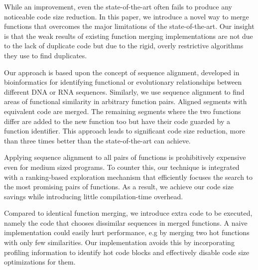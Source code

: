 While an improvement, even the state-of-the-art often fails to produce any
noticeable code size reduction. In this paper, we introduce a novel way to merge
functions that overcomes the major limitations of the state-of-the-art. Our
insight is that the weak results of existing function merging implementations
are not due to the lack of duplicate code but due to the rigid, overly restrictive
algorithms they use to find duplicates.

Our approach is based upon the concept of sequence alignment, developed in
bioinformatics for identifying functional or evolutionary relationships between
different DNA or RNA sequences. Similarly, we use sequence alignment to find
areas of functional similarity in arbitrary function pairs. Aligned segments
with equivalent code are merged. The remaining segments where the two functions
differ are added to the new function too but have their code guarded by a
function identifier. This approach leads to significant code size reduction,
more than three times better than the state-of-the-art can achieve.

Applying sequence alignment to all pairs of functions is prohibitively expensive
even for medium sized programs. To counter this, our technique is integrated with
a ranking-based exploration mechanism that efficiently focuses the search to the most
promising pairs of functions. %
As a result, we achieve our code size savings while introducing little compilation-time
overhead.

Compared to identical function merging, we introduce extra code to be executed,
namely the code that chooses dissimilar sequences in merged functions. A naive
implementation could easily hurt performance, e.g by merging two hot functions
with only few similarities. Our implementation avoids this by incorporating
profiling information to identify hot code blocks and effectively disable code
size optimizations for them. 

